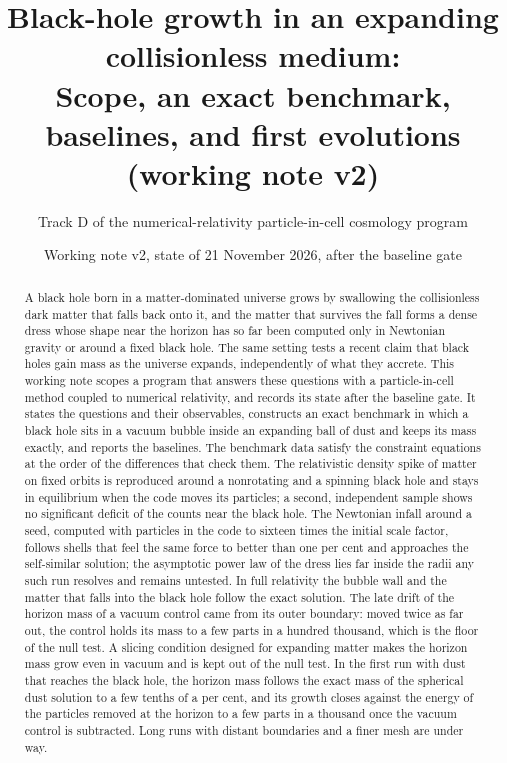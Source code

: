 \documentclass[aps,prd,twocolumn,10pt,superscriptaddress,nofootinbib,longbibliography,floatfix]{revtex4-2}
\begin{document}
\title{Black-hole growth in an expanding collisionless medium:\\ Scope, an exact benchmark, baselines, and first evolutions (working note v2)}

\author{Track D of the numerical-relativity particle-in-cell cosmology program}

\date{Working note v2, state of 21 November 2026, after the baseline gate}

\begin{abstract}
A black hole born in a matter-dominated universe grows by swallowing the collisionless dark matter that falls back onto it, and the matter that survives the fall forms a dense dress whose shape near the horizon has so far been computed only in Newtonian gravity or around a fixed black hole. The same setting tests a recent claim that black holes gain mass as the universe expands, independently of what they accrete. This working note scopes a program that answers these questions with a particle-in-cell method coupled to numerical relativity, and records its state after the baseline gate. It states the questions and their observables, constructs an exact benchmark in which a black hole sits in a vacuum bubble inside an expanding ball of dust and keeps its mass exactly, and reports the baselines. The benchmark data satisfy the constraint equations at the order of the differences that check them. The relativistic density spike of matter on fixed orbits is reproduced around a nonrotating and a spinning black hole and stays in equilibrium when the code moves its particles; a second, independent sample shows no significant deficit of the counts near the black hole. The Newtonian infall around a seed, computed with particles in the code to sixteen times the initial scale factor, follows shells that feel the same force to better than one per cent and approaches the self-similar solution; the asymptotic power law of the dress lies far inside the radii any such run resolves and remains untested. In full relativity the bubble wall and the matter that falls into the black hole follow the exact solution. The late drift of the horizon mass of a vacuum control came from its outer boundary: moved twice as far out, the control holds its mass to a few parts in a hundred thousand, which is the floor of the null test. A slicing condition designed for expanding matter makes the horizon mass grow even in vacuum and is kept out of the null test. In the first run with dust that reaches the black hole, the horizon mass follows the exact mass of the spherical dust solution to a few tenths of a per cent, and its growth closes against the energy of the particles removed at the horizon to a few parts in a thousand once the vacuum control is subtracted. Long runs with distant boundaries and a finer mesh are under way.
\end{abstract}
\end{document}
